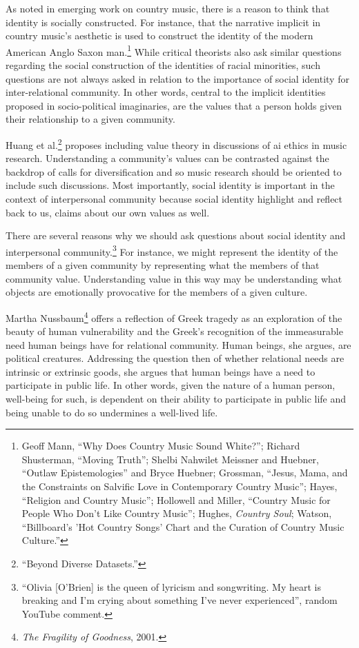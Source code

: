 \documentclass[phdthesis,12pt,final]{wuthesis}
\theoremstyle{definition}
\theoremstyle{definition}
\theoremstyle{definition}
\theoremstyle{definition}
\theoremstyle{remark}
\begin{document}
As noted in emerging work on country music, there is a reason to think that identity is socially constructed. For instance, that the narrative implicit in country music's aesthetic is used to construct the identity of the modern American Anglo Saxon man.\footnote{Geoff Mann, {``Why Does Country Music Sound White?''}; Richard Shusterman, {``Moving {Truth}''}; Shelbi Nahwilet Meissner and Huebner, {``Outlaw Epistemologies''} and Bryce Huebner; Grossman, {``Jesus, {Mama}, and the {Constraints} on {Salvific Love} in {Contemporary Country Music}''}; Hayes, {``Religion and {Country Music}''}; Hollowell and Miller, {``Country {Music} for {People Who Don}'t {Like Country Music}''}; Hughes, \emph{Country Soul}; Watson, {``Billboard's '{Hot Country Songs}' Chart and the Curation of Country Music Culture.''}} While critical theorists also ask similar questions regarding the social construction of the identities of racial minorities, such questions are not always asked in relation to the importance of social identity for inter-relational community. In other words, central to the implicit identities proposed in socio-political imaginaries, are the values that a person holds given their relationship to a given community.

Huang et al.\footnote{{``Beyond {Diverse Datasets}.''}} proposes including value theory in discussions of ai ethics in music research. Understanding a community's values can be contrasted against the backdrop of calls for diversification and so music research should be oriented to include such discussions. Most importantly, social identity is important in the context of interpersonal community because social identity highlight and reflect back to us, claims about our own values as well.

There are several reasons why we should ask questions about social identity and interpersonal community.\footnote{``Olivia {[}O'Brien{]} is the queen of lyricism and songwriting. My heart is breaking and I'm crying about something I've never experienced'', random YouTube comment.} For instance, we might represent the identity of the members of a given community by representing what the members of that community value. Understanding value in this way may be understanding what objects are emotionally provocative for the members of a given culture.

Martha Nussbaum\footnote{\emph{The {Fragility} of {Goodness}}, 2001.} offers a reflection of Greek tragedy as an exploration of the beauty of human vulnerability and the Greek's recognition of the immeasurable need human beings have for relational community. Human beings, she argues, are political creatures. Addressing the question then of whether relational needs are intrinsic or extrinsic goods, she argues that human beings have a need to participate in public life. In other words, given the nature of a human person, well-being for such, is dependent on their ability to participate in public life and being unable to do so undermines a well-lived life.
\end{document}
